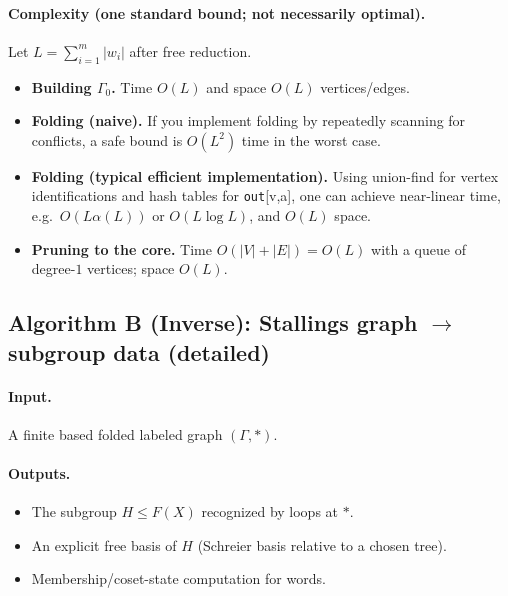 \documentclass[11pt]{article}
\theoremstyle{definition}
\theoremstyle{plain}
\theoremstyle{remark}
\begin{document}
\paragraph{Complexity (one standard bound; not necessarily optimal).}\cite{stallings1983,touikan2006,tarjan1975}
Let $L=\sum_{i=1}^m |w_i|$ after free reduction.
\begin{itemize}[leftmargin=2em]
\item \textbf{Building $\Gamma_0$.} Time $O(L)$ and space $O(L)$ vertices/edges.
\item \textbf{Folding (naive).} If you implement folding by repeatedly scanning for conflicts, a safe bound is $O(L^2)$ time in the worst case.
\item \textbf{Folding (typical efficient implementation).} Using union-find for vertex identifications and hash tables for \texttt{out}[v,a], one can achieve near-linear time, e.g.\ $O(L\alpha(L))$ or $O(L\log L)$, and $O(L)$ space.
\item \textbf{Pruning to the core.} Time $O(|V|+|E|)=O(L)$ with a queue of degree-$1$ vertices; space $O(L)$.
\end{itemize}


\subsection*{Algorithm B (Inverse): Stallings graph $\to$ subgroup data (detailed)}\cite{stallings1983,kapovichmyasnikov2002,touikan2006}
\paragraph{Input.}
A finite based folded labeled graph $(\Gamma,*)$.

\paragraph{Outputs.}
\begin{itemize}[leftmargin=2em]
\item The subgroup $H\le F(X)$ recognized by loops at $*$.
\item An explicit free basis of $H$ (Schreier basis relative to a chosen tree).
\item Membership/coset-state computation for words.
\end{itemize}
\end{document}
